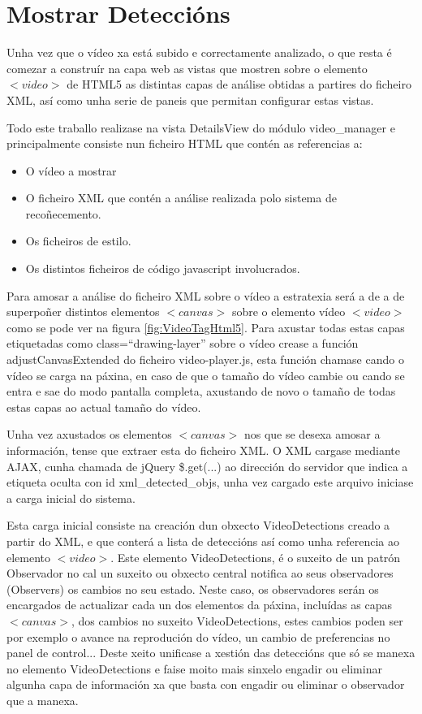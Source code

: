 \section{Mostrar Deteccións}
	
	Unha vez que o vídeo xa está subido e correctamente analizado, o que resta é comezar a construír
	na capa web as vistas que mostren sobre o elemento $<video>$ de HTML5 as distintas capas de 
	análise obtidas a partires do ficheiro XML, así como unha serie de paneis que permitan 
	configurar estas vistas.
	
	Todo este traballo realizase na vista DetailsView do módulo video\_manager e principalmente 
	consiste nun ficheiro HTML que contén as referencias a:
	\begin{itemize}
     \item O vídeo a mostrar
     \item O ficheiro XML que contén a análise realizada polo sistema de recoñecemento.
     \item Os ficheiros de estilo.
     \item Os distintos ficheiros de código javascript involucrados.
    \end{itemize}
    
    Para amosar a análise do ficheiro XML sobre o vídeo a estratexia será a de a de superpoñer 
    distintos elementos $<canvas>$ sobre o elemento vídeo $<video>$ como se pode ver na figura 
    \ref{fig:VideoTagHtml5}. Para axustar todas estas capas etiquetadas como class=``drawing-layer''
    sobre o vídeo crease a función adjustCanvasExtended do ficheiro video-player.js, esta función 
    chamase cando o vídeo se carga na páxina, en caso de que o tamaño do vídeo cambie ou cando se 
    entra e sae do modo pantalla completa, axustando de novo o tamaño de todas estas capas ao actual
    tamaño do vídeo.
    
    Unha vez axustados os elementos $<canvas>$ nos que se desexa amosar a información, tense que 
    extraer esta do ficheiro XML. O XML cargase mediante AJAX, cunha chamada de jQuery \$.get(...) 
    ao dirección do servidor que indica a etiqueta oculta con id xml\_detected\_objs, unha vez cargado
    este arquivo iniciase a carga inicial do sistema.
    
    Esta carga inicial consiste na creación dun obxecto VideoDetections creado a partir do XML, e
    que conterá a lista de deteccións así como unha referencia ao elemento $<video>$. Este elemento
    VideoDetections, é o suxeito de un patrón Observador no cal un suxeito ou obxecto central
    notifica ao seus observadores (Observers) os cambios no seu estado. Neste caso, os observadores
    serán os encargados de actualizar cada un dos elementos da páxina, incluídas as capas $<canvas>$,
    dos cambios no suxeito VideoDetections, estes cambios poden ser por exemplo o avance na 
    reprodución do vídeo, un cambio de preferencias no panel de control... Deste xeito unificase a 
    xestión das deteccións que só se manexa no elemento VideoDetections e faise moito mais sinxelo 
    engadir ou eliminar algunha capa de información xa que basta con engadir ou eliminar o 
    observador que a manexa.
    
